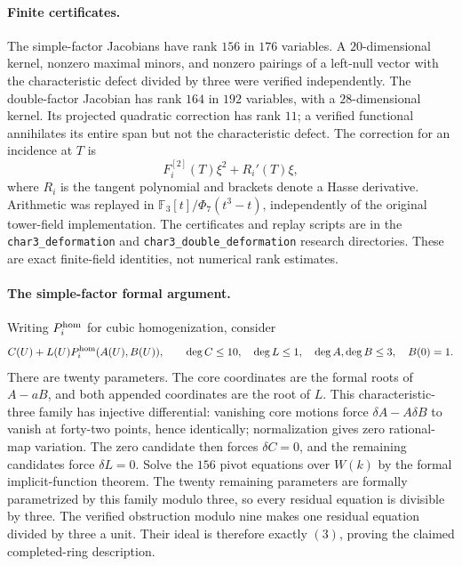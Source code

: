 \paragraph{Finite certificates.}
The simple-factor Jacobians have rank $156$ in $176$ variables. A
$20$-dimensional kernel, nonzero maximal minors, and nonzero pairings of a
left-null vector with the characteristic defect divided by three were
verified independently. The double-factor Jacobian has rank $164$ in
$192$ variables, with a $28$-dimensional kernel. Its projected quadratic
correction has rank $11$; a verified functional annihilates its entire
span but not the characteristic defect. The correction for an incidence
at $T$ is
\[
 F_i^{[2]}(T)\xi^2+R_i'(T)\xi,
\]
where $R_i$ is the tangent polynomial and brackets denote a Hasse
derivative. Arithmetic was replayed in
$\mathbb F_3[t]/\Phi_7(t^3-t)$, independently of the original tower-field
implementation. The certificates and replay scripts are in the
\texttt{char3\_deformation} and \texttt{char3\_double\_deformation}
research directories. These are exact finite-field identities, not
numerical rank estimates.

\paragraph{The simple-factor formal argument.}
Writing $P_i^{\rm hom}$ for cubic homogenization, consider
\[
 C(U)+L(U)P_i^{\rm hom}(A(U),B(U)),\qquad
 \deg C\le10,\quad \deg L\le1,\quad \deg A,\deg B\le3,
 \quad B(0)=1.
\]
There are twenty parameters. The core coordinates are the formal roots
of $A-aB$, and both appended coordinates are the root of $L$.
This characteristic-three family has injective differential: vanishing
core motions force $\delta A-A\delta B$ to vanish at forty-two points,
hence identically; normalization gives zero rational-map variation.
The zero candidate then forces $\delta C=0$, and the remaining candidates
force $\delta L=0$.
Solve the $156$ pivot equations over $W(k)$ by the formal implicit-function
theorem. The twenty remaining parameters are formally parametrized by this
family modulo three, so every residual equation is divisible by three.
The verified obstruction modulo nine makes one residual equation divided
by three a unit. Their ideal is therefore exactly $(3)$, proving the
claimed completed-ring description.

